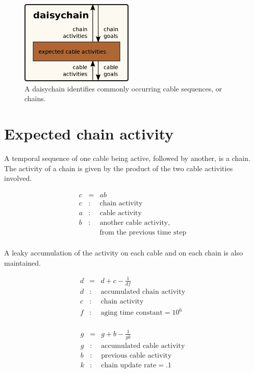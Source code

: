 \documentclass[oneside,twocolumn]{article}
\begin{document}
\begin{figure}[ht]
\centering
\includegraphics[height=4.0cm]{figs/daisychain.png}
\caption{A daisychain identifies commonly occurring cable sequences, or chains.}
\label{daisychain}
\end{figure}

\section*{\color{copper} Expected chain activity}

A temporal sequence of one cable being active, followed by another, is a chain. The activity of a chain is given by the product of the two cable activities involved.

\begin{eqnarray*}
c &= & ab\\ 
c &:& \mbox{chain activity} \\
a &:& \mbox{cable activity} \\
b &:& \mbox{another cable activity,}\\
&& \mbox{from the previous time step}\\
\end{eqnarray*}

A leaky accumulation of the activity on each cable and on each chain is also maintained.

\begin{eqnarray*}
d &= & d + c - \frac{1}{df}\\ 
d &:& \mbox{accumulated chain activity} \\
c &:& \mbox{chain activity} \\
f &:& \mbox{aging time constant} = 10^6 \\
\end{eqnarray*}

\begin{eqnarray*}
g &= & g + b - \frac{1}{gk}\\ 
g &:& \mbox{accumulated cable activity} \\
b &:& \mbox{previous cable activity} \\
k &:& \mbox{chain update rate} = .1 \\
\end{eqnarray*}
\end{document}
